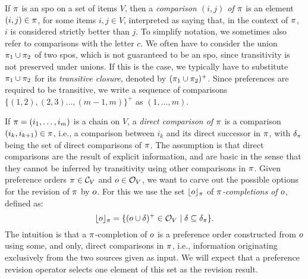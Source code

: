 If $\pi$ is an spo on a set of items $V$,
then a \emph{comparison $(i,j)$ of $\pi$} 
is an element $(i,j)\in\pi$, for some items $i,j\in V$,
interpreted as saying that, in the context of $\pi$, 
$i$ is considered strictly better than $j$.
To simplify notation, 
we sometimes also refer to comparisons with the letter $c$.
We often have to consider the union $\pi_1\cup\pi_2$ of two spos,
which is not guaranteed to be an spo, 
since transitivity is not preserved under unions.
If this is the case, we typically have to 
substitute $\pi_1\cup\pi_2$ for its 
\emph{transitive closure}, denoted by $(\pi_1\cup\pi_2)^+$.
Since preferences are required to be transitive, we write a sequence of comparisons
$\{(1,2),(2,3)\dots,(m{-}1,m)\}^+$ as $(1,\dots, m)$.

If $\pi = (i_1,\dots, i_m)$ is a chain on $V$,
a \emph{direct comparison of $\pi$} is a comparison 
$(i_k,i_{k+1})\in\pi$,
i.e., a comparison between $i_k$ and its direct successor in $\pi$,
with $\delta_\pi$ being the set of direct comparisons of $\pi$.
The assumption is that direct comparisons are the result of explicit information, 
and are basic in the sense that they cannot 
be inferred by transitivity using other comparisons in $\pi$.
Given preference orders $\pi\in\mathcal{C}_V$ and $o\in\mathcal{O}_V$, we want to carve out the
possible options for the revision of $\pi$ by $o$.
For this we use the set $\lfloor{o}\rfloor_\pi$ of \emph{$\pi$-completions of $o$}, defined as:
$$
\lfloor{o}\rfloor_\pi = \{(o\cup\delta)^+\in\mathcal{O}_V\mid\delta\subseteq\delta_\pi\}.
$$
The intuition is that a $\pi$-completion of $o$ is a preference order
constructed from $o$ using some, and only, direct comparisons in $\pi$, i.e., information
originating exclusively from the two sources given as input.
We will expect that a preference revision operator selects one element of this set as
the revision result.

